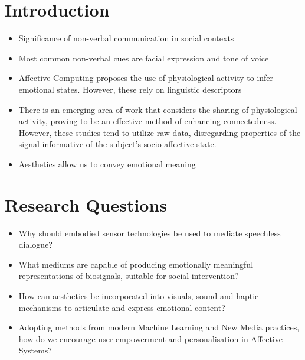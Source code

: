 

\section{Introduction}
\label{sec:objectives}

\begin{itemize}
  \item Significance of non-verbal communication in social contexts
  \item Most common non-verbal cues are facial expression and tone of voice
  \item Affective Computing proposes the use of physiological activity to infer emotional states. However, these rely on linguistic descriptors
  \item There is an emerging area of work that considers the sharing of physiological activity, proving to be an effective method of enhancing connectedness. However, these studies tend to utilize raw data, disregarding  properties of the signal informative of the subject's socio-affective state.
  \item Aesthetics allow us to convey emotional meaning
\end{itemize}

\section{Research Questions}
\label{sec:research_questions}

\begin{itemize}
    \item Why should embodied sensor technologies be used to mediate speechless dialogue?
    \item What mediums are capable of producing emotionally meaningful representations of biosignals, suitable for social intervention?
    \item How can aesthetics be incorporated into visuals, sound and haptic mechanisms to articulate and express emotional content?
    \item Adopting methods from modern Machine Learning and New Media practices, how do we encourage user empowerment and personalisation in Affective Systems?
\end{itemize}

